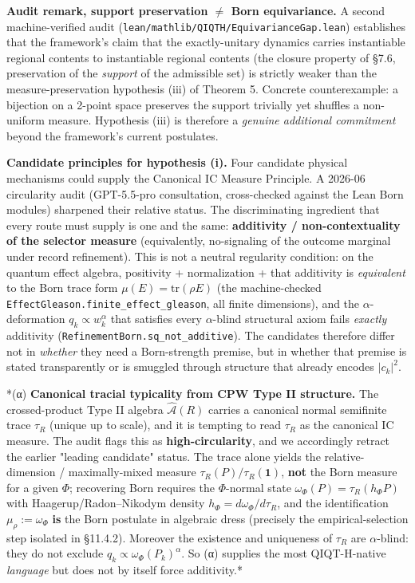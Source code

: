 \documentclass[11pt,a4paper]{article}
\begin{document}
\textbf{Audit remark, support preservation $\neq$ Born equivariance.} A second machine-verified audit (\texttt{lean/mathlib/QIQTH/EquivarianceGap.lean}) establishes that the framework's claim that the exactly-unitary dynamics carries instantiable regional contents to instantiable regional contents (the closure property of §7.6, preservation of the \emph{support} of the admissible set) is strictly weaker than the measure-preservation hypothesis (iii) of Theorem 5. Concrete counterexample: a bijection on a 2-point space preserves the support trivially yet shuffles a non-uniform measure. Hypothesis (iii) is therefore a \emph{genuine additional commitment} beyond the framework's current postulates.

\textbf{Candidate principles for hypothesis (i).} Four candidate physical mechanisms could supply the Canonical IC Measure Principle. A 2026-06 circularity audit (GPT-5.5-pro consultation, cross-checked against the Lean Born modules) sharpened their relative status. The discriminating ingredient that every route must supply is one and the same: \textbf{additivity / non-contextuality of the selector measure} (equivalently, no-signaling of the outcome marginal under record refinement). This is not a neutral regularity condition: on the quantum effect algebra, positivity + normalization + that additivity is \emph{equivalent} to the Born trace form $\mu(E)=\mathrm{tr}(\rho E)$ (the machine-checked \texttt{EffectGleason.finite\_effect\_gleason}, all finite dimensions), and the $\alpha$-deformation $q_k \propto w_k^{\alpha}$ that satisfies every $\alpha$-blind structural axiom fails \emph{exactly} additivity (\texttt{RefinementBorn.sq\_not\_additive}). The candidates therefore differ not in \emph{whether} they need a Born-strength premise, but in whether that premise is stated transparently or is smuggled through structure that already encodes $|c_k|^2$.

*(α) \textbf{Canonical tracial typicality from CPW Type II structure.} The crossed-product Type II algebra $\hat{\mathcal{A}}(R)$ carries a canonical normal semifinite trace $\tau_R$ (unique up to scale), and it is tempting to read $\tau_R$ as the canonical IC measure. The audit flags this as \textbf{high-circularity}, and we accordingly retract the earlier "leading candidate" status. The trace alone yields the relative-dimension / maximally-mixed measure $\tau_R(P)/\tau_R(\mathbf 1)$, \textbf{not} the Born measure for a given $\Phi$; recovering Born requires the $\Phi$-normal state $\omega_\Phi(P)=\tau_R(h_\Phi P)$ with Haagerup/Radon–Nikodym density $h_\Phi=d\omega_\Phi/d\tau_R$, and the identification $\mu_\rho := \omega_\Phi$ \textbf{is} the Born postulate in algebraic dress (precisely the empirical-selection step isolated in §11.4.2). Moreover the existence and uniqueness of $\tau_R$ are $\alpha$-blind: they do not exclude $q_k \propto \omega_\Phi(P_k)^{\alpha}$. So (α) supplies the most QIQT-H-native \emph{language} but does not by itself force additivity.*
\end{document}
